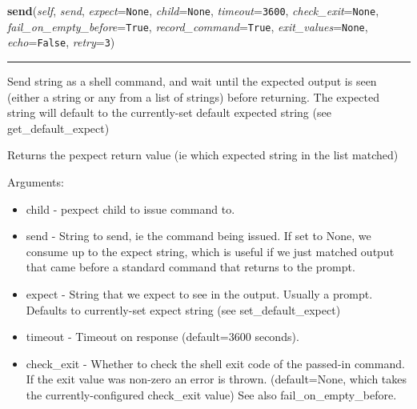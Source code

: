     \label{shutit_global:ShutIt:send}

    \vspace{0.5ex}

\hspace{.8\funcindent}\begin{boxedminipage}{\funcwidth}

    \raggedright \textbf{send}(\textit{self}, \textit{send}, \textit{expect}={\tt None}, \textit{child}={\tt None}, \textit{timeout}={\tt 3600}, \textit{check\_exit}={\tt None}, \textit{fail\_on\_empty\_before}={\tt True}, \textit{record\_command}={\tt True}, \textit{exit\_values}={\tt None}, \textit{echo}={\tt False}, \textit{retry}={\tt 3})

    \vspace{-1.5ex}

    \rule{\textwidth}{0.5\fboxrule}
\setlength{\parskip}{2ex}
    Send string as a shell command, and wait until the expected output is 
    seen (either a string or any from a list of strings) before returning. 
    The expected string will default to the currently-set default expected 
    string (see get\_default\_expect)

    Returns the pexpect return value (ie which expected string in the list 
    matched)

    Arguments:

    \begin{itemize}
    \setlength{\parskip}{0.6ex}
      \item child                      - pexpect child to issue command to.

      \item send                       - String to send, ie the command being 
        issued. If set to None, we consume up to the expect string, which 
        is useful if we just matched output that came before a standard 
        command that returns to the prompt.

      \item expect                     - String that we expect to see in the 
        output. Usually a prompt. Defaults to currently-set expect string 
        (see set\_default\_expect)

      \item timeout                    - Timeout on response (default=3600 
        seconds).

      \item check\_exit                 - Whether to check the shell exit code 
        of the passed-in command.  If the exit value was non-zero an error 
        is thrown. (default=None, which takes the currently-configured 
        check\_exit value) See also fail\_on\_empty\_before.


\end{itemize}
\end{boxedminipage}
